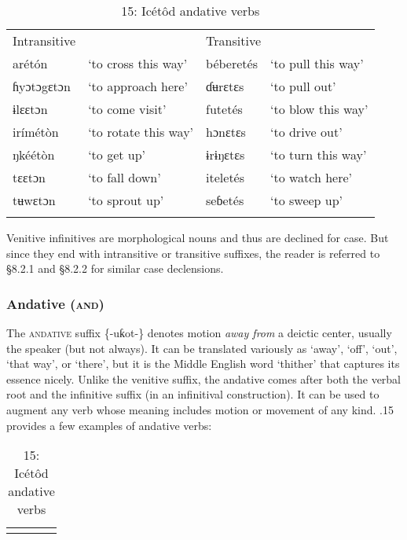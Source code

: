 \begin{table}
\begin{table}
\begin{tabularx}{\textwidth}{XXXX}
Intransitive &  & \multicolumn{2}{X}{Transitive}\\
arétón & ‘to cross this way’ & béberetés & ‘to pull this way’\\
ɦyɔtɔgɛtɔn & ‘to approach here’ & ɗʉrɛtɛs & ‘to pull out’\\
ɨlɛɛtɔn & ‘to come visit’ & futetés & ‘to blow this way’\\
irímétòn & ‘to rotate this way’ & hɔnɛtɛs & ‘to drive out’\\
ŋkéétòn & ‘to get up’ & ɨrɨŋɛtɛs & ‘to turn this way’\\
tɛɛtɔn & ‘to fall down’ & iteletés & ‘to watch here’\\
tʉwɛtɔn & ‘to sprout up’ & seɓetés & ‘to sweep up’\\
\lspbottomrule
\end{tabularx}
\end{table}
Venitive infinitives are morphological nouns and thus are declined for case. But since they end with intransitive or transitive suffixes, the reader is referred to §8.2.1 and §8.2.2 for similar case declensions.


\subsubsection{Andative (\textsc{and})}

The \textsc{andative }suffix \{-uƙot-\} denotes motion \textit{away from} a deictic center, usually the speaker (but not always). It can be translated variously as ‘away’, ‘off’, ‘out’, ‘that way’, or ‘there’, but it is the Middle English word ‘thither’ that captures its essence nicely. Unlike the venitive suffix, the andative comes after both the verbal root and the infinitive suffix (in an infinitival construction). It can be used to augment any verb whose meaning includes motion or movement of any kind. .15 provides a few examples of andative verbs:


\begin{table}
\caption{15: Icétôd andative verbs}
\label{tab:8}


\begin{tabularx}{\textwidth}{XXXX}
\lsptoprule


\end{tabularx}
\end{table}
\end{table}
